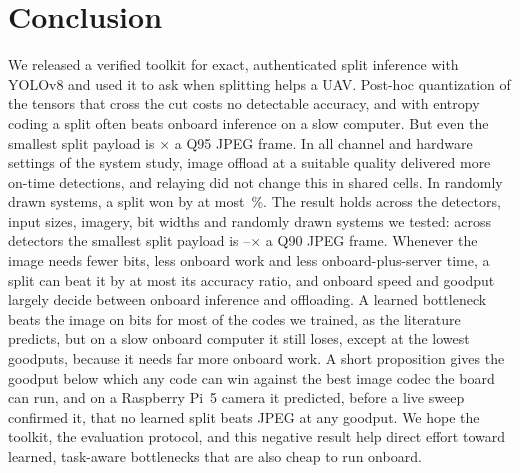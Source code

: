 \documentclass[journal,twocolumn,10pt]{IEEEtran}
\begin{document}
\section{Conclusion}
We released a verified toolkit for exact, authenticated split inference with YOLOv8 and used it to ask when splitting helps a UAV. Post-hoc quantization of the tensors that cross the cut costs no detectable accuracy, and with entropy coding a split often beats onboard inference on a slow computer. But even the smallest split payload is \RatioMinSplitOverJPEGQNinetyFive$\times$ a Q95 JPEG frame. In all \NumCells{} channel and hardware settings of the system study, image offload at a suitable quality delivered more on-time detections, and relaying did not change this in shared cells. In randomly drawn systems, a split won by at most \GenMaxSplitGainPct\,\%. The result holds across the detectors, input sizes, imagery, bit widths and randomly drawn systems we tested: across \GenNModels{} detectors the smallest split payload is \GenRatioMin--\GenRatioMax$\times$ a Q90 JPEG frame. Whenever the image needs fewer bits, less onboard work and less onboard-plus-server time, a split can beat it by at most its accuracy ratio, and onboard speed and goodput largely decide between onboard inference and offloading. A learned bottleneck beats the image on bits for most of the codes we trained, as the literature predicts, but on a slow onboard computer it still loses, except at the lowest goodputs, because it needs far more onboard work. A short proposition gives the goodput below which any code can win against the best image codec the board can run, and on a Raspberry Pi~5 camera it predicted, before a live sweep confirmed it, that no learned split beats JPEG at any goodput. We hope the toolkit, the evaluation protocol, and this negative result help direct effort toward learned, task-aware bottlenecks that are also cheap to run onboard.



\end{document}
